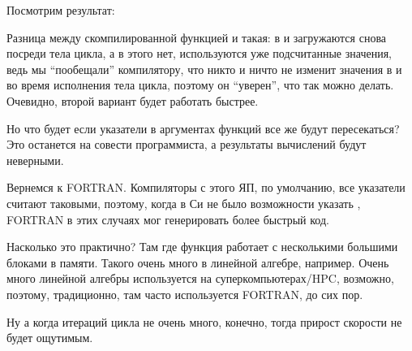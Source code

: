 Посмотрим результат:





Разница между скомпилированной функцией  и  такая: 
в   и  загружаются снова посреди тела цикла,
а в  этого нет, используются уже подсчитанные значения, ведь мы ``пообещали'' компилятору, 
что никто и ничто не изменит
значения в  и  во время исполнения тела цикла, поэтому он ``уверен'', что так можно делать. 
Очевидно, второй вариант будет работать быстрее.

Но что будет если указатели в аргументах функций все же будут пересекаться? Это останется на совести программиста, 
а результаты вычислений будут неверными.

Вернемся к FORTRAN. Компиляторы с этого ЯП, по умолчанию, все указатели считают таковыми, поэтому, когда в Си не было
возможности указать , FORTRAN в этих случаях мог генерировать более быстрый код.

Насколько это практично? Там где функция работает с несколькими большими блоками в памяти. 
Такого очень много в линейной алгебре, например. Очень много линейной алгебры используется на суперкомпьютерах/HPC,
возможно, поэтому, традиционно, там часто используется FORTRAN, до сих пор\cite{Loh:2010:IHP:1810226.1820518}.

Ну а когда итераций цикла не очень много, конечно, тогда прирост скорости не будет ощутимым.

